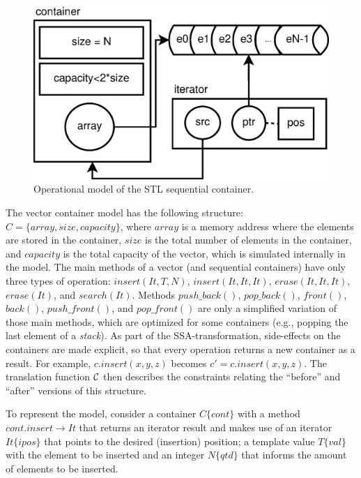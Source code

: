 \documentclass[a4paper]{llncs}
\begin{document}
\vspace*{-2ex}

\begin{figure}[ht] \centering
\includegraphics[scale=0.3]{figures/stl-iterator}
\caption{Operational model of the STL sequential container.} \vspace*{-4ex}
\label{figure:stl-iterator}
\end{figure}

The vector container model has the following structure:
$C = \{ array, size, capacity\}$,
where $array$ is a memory address where the elements are stored in the container,
$size$ is the total number of elements in the container, and $capacity$
is the total capacity of the vector, which is simulated internally in the model.
The main methods of a vector (and sequential containers) have only
three types of operation: $\mathit{insert\left(It, T, N\right)}$,
$\mathit{insert\left(It, It, It\right)}$, $\mathit{erase\left(It, It, It\right)}$,
$\mathit{erase\left(It\right)}$, and $\mathit{search\left(It\right)}$.
Methods $push\_back\left(\right)$, $pop\_back\left(\right)$, $front\left(\right)$,
$back\left(\right)$, $push\_front\left(\right)$, and $pop\_front\left(\right)$ are only
a simplified variation of those main methods, which are optimized for some containers
(e.g., popping the last element of a \textit{stack}).
As part of the SSA-transformation, side-effects on the containers are made explicit,
so that every operation returns a new container as a result. For example,
$\mathit{c.insert\left(x,y,z\right)}$ becomes $\mathit{c' = c.insert\left(x,y,z\right)}$.
The translation function $\cal C$ then describes the constraints relating the ``before''
and ``after'' versions of this structure.

To represent the model, consider a container $C\{cont\}$ with a
method $cont.insert \rightarrow It$ that returns an iterator result and
makes use of an iterator $It\{ipos\}$ that points to the desired
(insertion) position; a template value $T\{val\}$ with the element
to be inserted and an integer $N\{qtd\}$ that informs the amount
of elements to be inserted.
\end{document}

